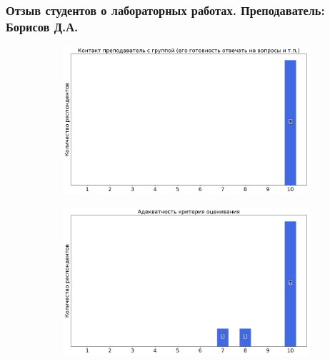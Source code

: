     \subsubsection{Отзыв студентов о лабораторных работах. Преподаватель: Борисов Д.А.}
        \begin{figure}[H]
            \centering
            \begin{subfigure}[b]{0.45\textwidth}
                \centering
                \includegraphics[width=\textwidth]{images/3 course/Радиофизическая лаборатория/labniks-marks-Борисов Д.А.-0.png}
            \end{subfigure}
            \begin{subfigure}[b]{0.45\textwidth}
                \centering
                \includegraphics[width=\textwidth]{images/3 course/Радиофизическая лаборатория/labniks-marks-Борисов Д.А.-1.png}
            \end{subfigure}
            \begin{subfigure}[b]{0.45\textwidth}
                \centering

\end{subfigure}
\end{figure}
